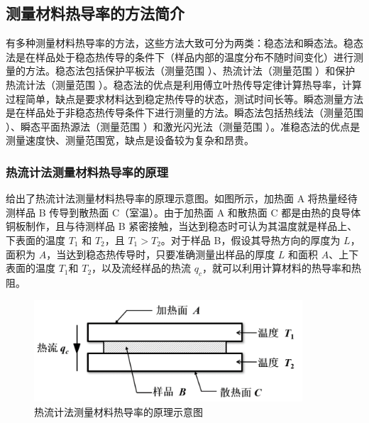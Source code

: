     \subsection{测量材料热导率的方法简介}
        有多种测量材料热导率的方法，这些方法大致可分为两类：稳态法和瞬态法。稳态法是在样品处于稳态热传导的条件下（样品内部的温度分布不随时间变化）进行测量的方法。稳态法包括保护平板法（测量范围 ）、热流计法（测量范围 ）和保护热流计法（测量范围 ）。稳态法的优点是利用傅立叶热传导定律计算热导率，计算过程简单，缺点是要求材料达到稳定热传导的状态，测试时间长等。瞬态测量方法是在样品处于非稳态热传导条件下进行测量的方法。瞬态法包括热线法（测量范围 ）、瞬态平面热源法（测量范围 ）和激光闪光法（测量范围 ）。准稳态法的优点是测量速度快、测量范围宽，缺点是设备较为复杂和昂贵。
        \subsubsection{热流计法测量材料热导率的原理}
             给出了热流计法测量材料热导率的原理示意图。如图所示，加热面 A 将热量经待测样品 B 传导到散热面 C（室温）。由于加热面 A 和散热面 C 都是由热的良导体铜板制作，且与待测样品 B 紧密接触，当达到稳态时可认为其温度就是样品上、下表面的温度 $T_1$ 和 $T_2$，且 $T_1 > T_2$。对于样品 B，假设其导热方向的厚度为 $L$，面积为 $A$，当达到稳态热传导时，只要准确测量出样品的厚度 $L$ 和面积 $A$、上下表面的温度 $T_1$和 $T_2$，以及流经样品的热流 $q_c$，就可以利用计算材料的热导率和热阻。
            \begin{figure}[!ht]\centering
                \includegraphics[width=100mm]{img/A10/fg1.png}
                \caption{热流计法测量材料热导率的原理示意图 \label{fig:A10.1}}
            \end{figure}
